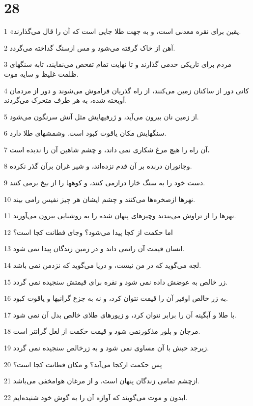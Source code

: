 \chapter{28}

\par 1 «یقین برای نقره معدنی است، و به جهت طلا جایی است که آن را قال می‌گذارند.
\par 2 آهن از خاک گرفته می‌شود و مس ازسنگ گداخته می‌گردد.
\par 3 مردم برای تاریکی حدمی گذارند و تا نهایت تمام تفحص می‌نمایند، تابه سنگهای ظلمت غلیظ و سایه موت.
\par 4 کانی دور از ساکنان زمین می‌کنند، از راه گذریان فراموش می‌شوند و دور از مردمان آویخته شده، به هر طرف متحرک می‌گردند.
\par 5 از زمین نان بیرون می‌آید، و ژرفیهایش مثل آتش سرنگون می‌شود.
\par 6 سنگهایش مکان یاقوت کبود است. وشمشهای طلا دارد.
\par 7 آن راه را هیچ مرغ شکاری نمی داند، و چشم شاهین آن را ندیده است،
\par 8 وجانوران درنده بر آن قدم نزده‌اند، و شیر غران برآن گذر نکرده.
\par 9 دست خود را به سنگ خارا درازمی کنند، و کوهها را از بیخ برمی کنند.
\par 10 نهرها ازصخره‌ها می‌کنند و چشم ایشان هر چیز نفیس رامی بیند.
\par 11 نهرها را از تراوش می‌بندند وچیزهای پنهان شده را به روشنایی بیرون می‌آورند.
\par 12 اما حکمت از کجا پیدا می‌شود؟ وجای فطانت کجا است؟
\par 13 انسان قیمت آن رانمی داند و در زمین زندگان پیدا نمی شود.
\par 14 لجه می‌گوید که در من نیست، و دریا می‌گوید که نزدمن نمی باشد.
\par 15 زر خالص به عوضش داده نمی شود و نقره برای قیمتش سنجیده نمی گردد.
\par 16 به زر خالص اوفیر آن را قیمت نتوان کرد، و نه به جزع گرانبها و یاقوت کبود.
\par 17 با طلا و آبگینه آن را برابر نتوان کرد، و زیورهای طلای خالص بدل آن نمی شود.
\par 18 مرجان و بلور مذکورنمی شود و قیمت حکمت از لعل گرانتر است.
\par 19 زبرجد حبش با آن مساوی نمی شود و به زرخالص سنجیده نمی گردد.
\par 20 پس حکمت ازکجا می‌آید؟ و مکان فطانت کجا است؟
\par 21 ازچشم تمامی زندگان پنهان است، و از مرغان هوامخفی می‌باشد.
\par 22 ابدون و موت می‌گویند که آوازه آن را به گوش خود شنیده‌ایم.
